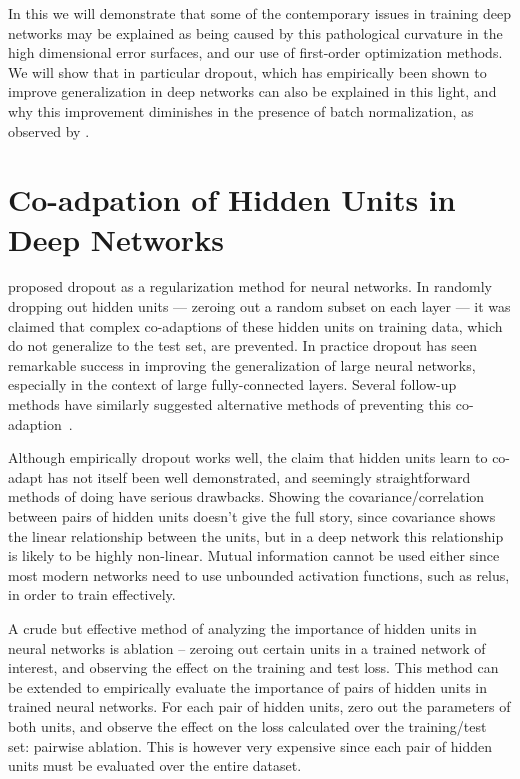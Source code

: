 \documentclass[thesis]{subfiles}
\begin{document}
In this  we will demonstrate that some of the contemporary issues in training deep networks may be explained as being caused by this pathological curvature in the high dimensional error surfaces, and our use of first-order optimization methods. We will show that in particular dropout, which has empirically been shown to improve generalization in deep networks can also be explained in this light, and why this improvement diminishes in the presence of batch normalization, as observed by \citet{Ioffe2015}.

\section{Co-adpation of Hidden Units in Deep Networks}
\citet{dropout,dropoutjmlr} proposed dropout as a regularization method for neural networks. In randomly dropping out hidden units --- zeroing out a random subset on each layer --- it was claimed that complex co-adaptions of these hidden units on training data, which do not generalize to the test set, are prevented. In practice dropout has seen remarkable success in improving the generalization of large neural networks, especially in the context of large fully-connected layers. Several follow-up methods have similarly suggested alternative methods of preventing this co-adaption~\citep{Cogswell2016}.

Although empirically dropout works well, the claim that hidden units learn to co-adapt has not itself been well demonstrated, and seemingly straightforward methods of doing have serious drawbacks. Showing the covariance/correlation between pairs of hidden units doesn't give the full story, since covariance shows the linear relationship between the units, but in a deep network this relationship is likely to be highly non-linear. Mutual information cannot be used either since most modern networks need to use unbounded activation functions, such as \glspl{relu}, in order to train effectively.

A crude but effective method of analyzing the importance of hidden units in neural networks is ablation -- zeroing out certain units in a trained network of interest, and observing the effect on the training and test loss. This method can be extended to empirically evaluate the importance of pairs of hidden units in trained neural networks. For each pair of hidden units, zero out the parameters of both units, and observe the effect on the loss calculated over the training/test set: pairwise ablation. This is however very expensive since each pair of hidden units must be evaluated over the entire dataset.
\end{document}
